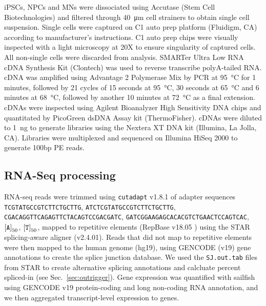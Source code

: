 iPSCs, NPCs and MNs were dissociated using Accutase (Stem Cell Biotechnologies) and filtered through \SI{40}{\micro\meter} cell strainers to obtain single cell suspension. Single cells were captured on C1 auto prep platform (Fluidigm, CA) according to manufacturer’s instructions. C1 auto prep chips were visually inspected with a light microscopy at 20X to ensure singularity of captured cells. All non-single cells were discarded from analysis. SMARTer Ultra Low RNA cDNA Synthesis Kit (Clontech) was used to reverse transcribe polyA-tailed RNA. cDNA was amplified using Advantage 2 Polymerase Mix by PCR at \SI{95}{\degreeCelsius} for 1 minutes, followed by 21 cycles of 15 seconds at \SI{95}{\degreeCelsius}, 30 seconds at \SI{65}{\degreeCelsius} and 6 minutes at \SI{68}{\degreeCelsius}, followed by another 10 minutes at \SI{72}{\degreeCelsius} as a final extension. cDNAs were inspected using Agilent Bioanalyzer High Sensitivity DNA chips and quantitated by PicoGreen dsDNA Assay kit (ThermoFisher). cDNAs were diluted to \SI{1}{\nano\gram} to generate libraries using the Nextera XT DNA kit (Illumina, La Jolla, CA). Libraries were multiplexed and sequenced on Illumina HiSeq 2000 to generate 100bp PE reads.

\subsection{RNA-Seq processing}

RNA-seq reads were trimmed using \texttt{cutadapt} v1.8.1 of adapter sequences \texttt{TCGTATGCCGTCTTCTGCTTG}, \texttt{ATCTCGTATGCCGTCTTCTGCTTG}, \texttt{CGACAGGTTCAGAGTTCTACAGTCCGACGATC}, \texttt{GATCGGAAGAGCACACGTCTGAACTCCAGTCAC}, $\left[\text{\texttt{A}}\right]_{50}$, $\left[\text{\texttt{T}}\right]_{50}$, mapped to repetitive elements (RepBase v18.05 \cite{Jurka:2005tp}) using the STAR\cite{Dobin:2013fg} splicing-aware aligner (v2.4.01). Reads that did not map to repetitive elements were then mapped to the human genome (hg19), using GENCODE\cite{Harrow:2012cx} (v19) gene annotations to create the splice junction database. We used the  \texttt{SJ.out.tab} files from STAR to create alternative splicing annotations and calcluate percent spliced-in (see Sec.~\ref{sec:outrigger}). Gene expression was quantified with sailfish\cite{Patro:2014jd} using GENCODE v19 protein-coding and long non-coding RNA annotation, and we then aggregated transcript-level expression to genes.


